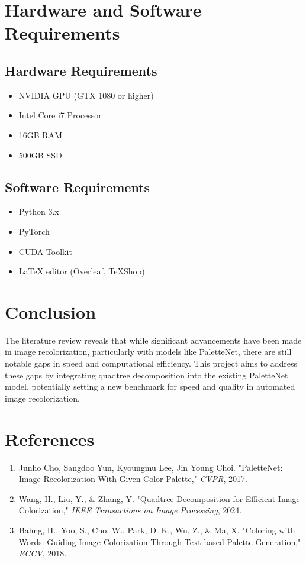 \documentclass[12pt,a4paper]{report}
\begin{document}
\section*{Hardware and Software Requirements}

\subsection*{Hardware Requirements}
\begin{itemize}
    \item NVIDIA GPU (GTX 1080 or higher)
    \item Intel Core i7 Processor
    \item 16GB RAM
    \item 500GB SSD
\end{itemize}

\subsection*{Software Requirements}
\begin{itemize}
    \item Python 3.x
    \item PyTorch
    \item CUDA Toolkit
    \item LaTeX editor (Overleaf, TeXShop)
\end{itemize}

\section*{Conclusion}

The literature review reveals that while significant advancements have been made in image recolorization, particularly with models like PaletteNet, there are still notable gaps in speed and computational efficiency. This project aims to address these gaps by integrating quadtree decomposition into the existing PaletteNet model, potentially setting a new benchmark for speed and quality in automated image recolorization.

\section*{References}
\begin{enumerate}
    \item Junho Cho, Sangdoo Yun, Kyoungmu Lee, Jin Young Choi. "PaletteNet: Image Recolorization With Given Color Palette," \textit{CVPR}, 2017.
    \item Wang, H., Liu, Y., & Zhang, Y. "Quadtree Decomposition for Efficient Image Colorization," \textit{IEEE Transactions on Image Processing}, 2024.
    \item Bahng, H., Yoo, S., Cho, W., Park, D. K., Wu, Z., & Ma, X. "Coloring with Words: Guiding Image Colorization Through Text-based Palette Generation," \textit{ECCV}, 2018.
\end{enumerate}
\end{document}
